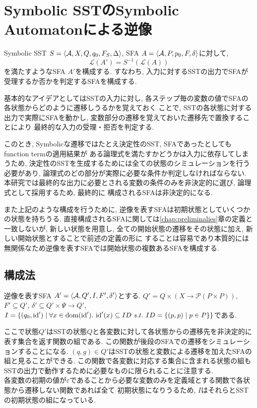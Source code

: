 \documentclass[uplatex,dvipdfmx,a4j]{jsreport}
\begin{document}
  \chapter{Symbolic SSTのSymbolic Automatonによる逆像}  \label{chap:symbolic_preimage}

  Symbolic SST $S = {\langle {\mathcal{A}, X, Q, q_0, F_S, \Delta} \rangle}$,
  SFA $A = {\langle {\mathcal{A}, P, p_0, F, \delta} \rangle}$に対して,
  \[
    \mathcal{L}(A') = S^{-1}(\mathcal{L}(A))
  \]
  を満たすようなSFA $A'$を構成する.
  すなわち, 入力に対するSSTの出力でSFAが受理するか否かを判定するSFAを構成する.

  基本的なアイデアとしてはSSTの入力に対し, 各ステップ毎の変数の値でSFAの各状態からどのように遷移しうるかを覚えておく
  ことで, SSTの各状態に対する出力で実際にSFAを動かし, 変数部分の遷移を覚えておいた遷移先で置換することにより
  最終的な入力の受理・拒否を判定する.

  このとき, Symbolicな遷移ではたとえ決定性のSST, SFAであったとしてもfunction termの適用結果が
  ある論理式を満たすかどうかは入力に依存してしまうため, 決定性のSSTを生成するためには全ての状態のシミュレーションを行う
  必要があり, 論理式のどの部分が実際に必要な条件か判定しなければならない.
  本研究では最終的な出力に必要とされる変数の条件のみを非決定的に選び, 論理式として採用するため, 最終的に
  構成されるSFAは非決定的になる.

  また上記のような構成を行うために, 逆像を表すSFAは初期状態としていくつかの状態を持ちうる.
  直接構成されるSFAに関しては\ref{chap:preliminalies}章の定義と一致しないが,
  新しい状態を用意し, 全ての開始状態の遷移をその状態に加え, 新しい開始状態とすることで前述の定義の形に
  することは容易であり本質的には無関係なため逆像を表すSFAでは開始状態の複数あるSFAを構成する.

  \section{構成法}
  逆像を表すSFA $A' = {\langle {\mathcal{A}, Q', I, F', \delta'} \rangle}$とする.
  $Q' = Q \times (X \rightarrow \mathcal{P}(P \times P))$,
  $F' \subseteq Q'$, $\delta' \subseteq Q' \times \Psi \rightarrow Q'$,
  $I = \{ (q_0, \mbox{id}') \mid \forall x \in \mbox{dom}(\mbox{id}').\ \mbox{id}'(x) \subseteq ID\
  s.t.\ ID = \{ (p, p) \mid p \in P \} \}$である.

  ここで状態$Q'$はSSTの状態$Q$と各変数に対して各状態からの遷移先を非決定的に表す集合を返す関数の組である.
  この関数が後段のSFAでの遷移をシミュレーションすることになる.
  $(q, g) \in Q'$はSSTの状態と変数による遷移を加えたSFAの組と見ることができる.
  この関数で各変数に対応する集合に含まれる状態の組もSSTの出力で動作するために必要なものに限られることに注意する. \\
  各変数の初期の値が$\varepsilon$であることから必要な変数のみを定義域とする関数で各状態から遷移しない関数であれば全て
  初期状態になりうるため, $I$はそれらとSSTの初期状態の組になっている.
\end{document}
